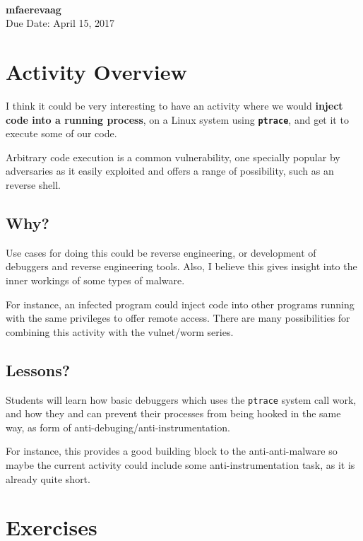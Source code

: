 \documentclass[a4paper, 11pt]{article}
\theoremstyle{definition}
\begin{document}
 \\
         {\phantom{} \hfill \textbf{mfaerevaag}} \\
         {\phantom{} \hfill Due Date: April 15, 2017} \\


\section{Activity Overview}
I think it could be very interesting to have an activity where we would {\bf
  inject code into a running process}, on a Linux system using {\tt\bf ptrace},
and get it to execute some of our code.

Arbitrary code execution is a common vulnerability, one specially popular by
adversaries as it easily exploited and offers a range of possibility, such as an
reverse shell.

\subsection{Why?}
Use cases for doing this could be reverse engineering, or development
of debuggers and reverse engineering tools. Also, I believe this gives
insight into the inner workings of some types of malware.

For instance, an infected program could inject code into other programs running
with the same privileges to offer remote access. There are many possibilities
for combining this activity with the vulnet/worm series.

\subsection{Lessons?}
Students will learn how basic debuggers which uses the {\tt ptrace} system call
work, and how they and can prevent their processes from being hooked in the same
way, as form of anti-debuging/anti-instrumentation.

For instance, this provides a good building block to the anti-anti-malware so
maybe the current activity could include some anti-instrumentation task, as it is
already quite short.


\section{Exercises}
\end{document}
